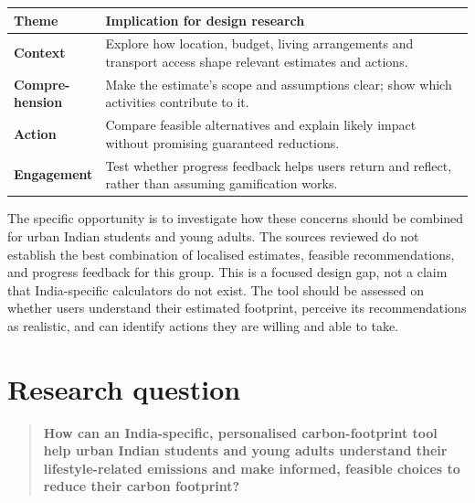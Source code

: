 \documentclass[10pt,a4paper,twocolumn]{article}
\begin{document}
\begin{table}[t]
\centering
\small
\begin{tabularx}{\columnwidth}{>{\bfseries}p{1.35cm} X}
\toprule
Theme & Implication for design research\\
\midrule
Context & Explore how location, budget, living arrangements and transport access shape relevant estimates and actions.\\
\makecell[l]{Compre-\\hension} & Make the estimate's scope and assumptions clear; show which activities contribute to it.\\
\addlinespace[2pt]
Action & Compare feasible alternatives and explain likely impact without promising guaranteed reductions.\\
\addlinespace[2pt]
Engagement & Test whether progress feedback helps users return and reflect, rather than assuming gamification works.\\
\bottomrule
\end{tabularx}
\end{table}

The specific opportunity is to investigate how these concerns should be combined for urban Indian students and young adults. The sources reviewed do not establish the best combination of localised estimates, feasible recommendations, and progress feedback for this group. This is a focused design gap, not a claim that India-specific calculators do not exist. The tool should be assessed on whether users understand their estimated footprint, perceive its recommendations as realistic, and can identify actions they are willing and able to take.

\section{Research question}
\begin{quote}
\small
\textbf{How can an India-specific, personalised carbon-footprint tool help urban Indian students and young adults understand their lifestyle-related emissions and make informed, feasible choices to reduce their carbon footprint?}
\end{quote}
\end{document}
